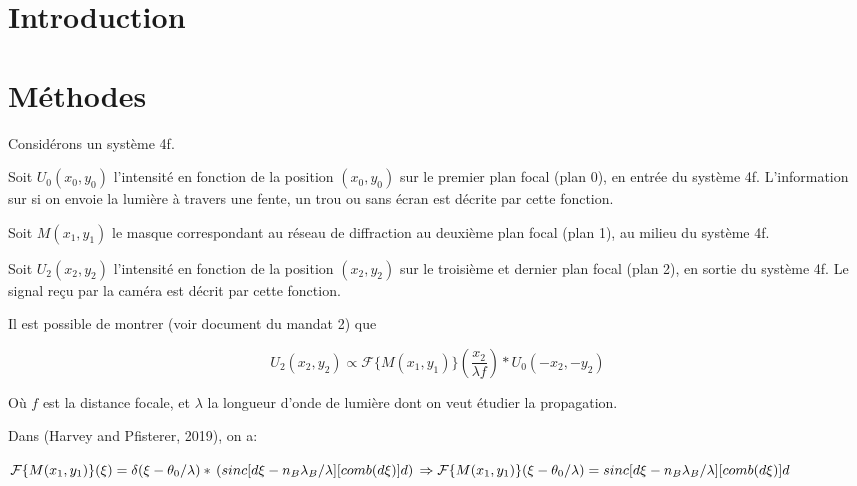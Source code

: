 \documentclass[11pt,letterpaper]{article}
\begin{document}

\twocolumn[]

\section{Introduction}


\section{Méthodes}

Considérons un système 4f.

Soit $U_0(x_0,y_0)$ l'intensité en fonction de la position $(x_0,y_0)$ sur le premier plan focal (plan 0), en entrée du système 4f. L'information sur si on envoie la lumière à travers une fente, un trou ou sans écran est décrite par cette fonction.

Soit $M(x_1,y_1)$ le masque correspondant au réseau de diffraction au deuxième plan focal (plan 1), au milieu du système 4f.

Soit $U_2(x_2,y_2)$ l'intensité en fonction de la position $(x_2,y_2)$ sur le troisième et dernier plan focal (plan 2), en sortie du système 4f. Le signal reçu par la caméra est décrit par cette fonction.

Il est possible de montrer (voir document du mandat 2) que 

\begin{equation}
    U_2(x_2,y_2) \propto
    \mathcal{F}\{M(x_1,y_1)\}(\frac{x_2}{\lambda f})
    * U_0(-x_2,-y_2)
\end{equation}

Où $f$ est la distance focale, et $\lambda$ la longueur d'onde de lumière dont on veut étudier la propagation.

Dans (Harvey and Pfisterer, 2019), on a:

$
    \mathcal{F}\{M(x_1,y_1)\}(\xi)= \delta(\xi-\theta_0/\lambda) * \\
    \left(sinc[d\xi-n_B\lambda_B/\lambda][comb(d\xi)]d \right)
    \\
    \Rightarrow
    \mathcal{F}\{M(x_1,y_1)\}(\xi-\theta_0/\lambda)= \\
    sinc[d\xi-n_B\lambda_B/\lambda][comb(d\xi)]d
$
\end{document}
